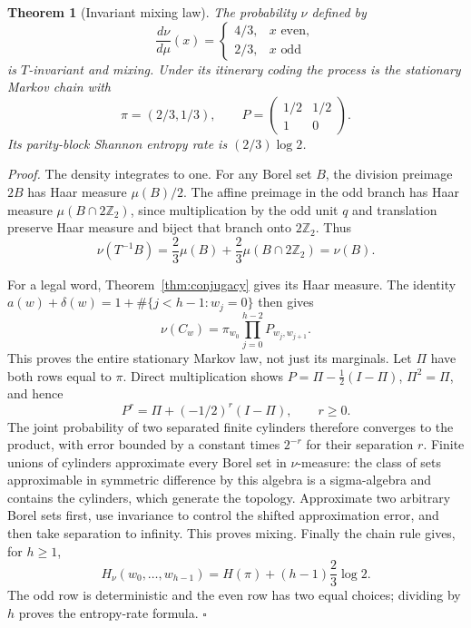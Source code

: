 \documentclass[11pt,letterpaper]{article}
\newcommand{\Z}{\mathbb{Z}}
\newtheorem{theorem}{Theorem}
\newenvironment{proof}{\noindent\textit{Proof.}}{\hfill\(\square\)}
\begin{document}
\begin{theorem}[Invariant mixing law]
\label{thm:measure}
The probability \(\nu\) defined by
\[
\frac{d\nu}{d\mu}(x)=
\begin{cases}4/3,&x\text{ even},\\2/3,&x\text{ odd}\end{cases}
\]
is \(T\)-invariant and mixing. Under its itinerary coding the process
is the stationary Markov chain with
\[
\pi=(2/3,1/3),\qquad
P=\begin{pmatrix}1/2&1/2\\1&0\end{pmatrix}.
\]
Its parity-block Shannon entropy rate is \((2/3)\log2\).
\end{theorem}

\begin{proof}
The density integrates to one. For any Borel set \(B\), the division
preimage \(2B\) has Haar measure \(\mu(B)/2\). The affine preimage
in the odd branch has Haar measure \(\mu(B\cap2\Z_2)\), since
multiplication by the odd unit \(q\) and translation preserve Haar
measure and biject that branch onto \(2\Z_2\). Thus
\[
\nu(T^{-1}B)=\frac23\mu(B)+\frac23\mu(B\cap2\Z_2)=\nu(B).
\]

For a legal word, Theorem~\ref{thm:conjugacy} gives its Haar measure.
The identity
\(a(w)+\delta(w)=1+\#\{j<h-1:w_j=0\}\) then gives
\[
\nu(C_w)=\pi_{w_0}\prod_{j=0}^{h-2}P_{w_j,w_{j+1}}.
\]
This proves the entire stationary Markov law, not just its marginals.
Let \(\Pi\) have both rows equal to \(\pi\). Direct multiplication
shows \(P=\Pi-\tfrac12(I-\Pi)\), \(\Pi^2=\Pi\), and hence
\[
P^r=\Pi+(-1/2)^r(I-\Pi),\qquad r\ge0.
\]
The joint probability of two separated finite cylinders therefore
converges to the product, with error bounded by a constant times
\(2^{-r}\) for their separation \(r\). Finite unions of cylinders
approximate every Borel set in \(\nu\)-measure: the class of sets
approximable in symmetric difference by this algebra is a sigma-algebra
and contains the cylinders, which generate the topology. Approximate
two arbitrary Borel sets first, use invariance to control the shifted
approximation error, and then take separation to infinity. This proves
mixing. Finally the chain rule gives, for \(h\ge1\),
\[
H_\nu(w_0,\ldots,w_{h-1})=H(\pi)+(h-1)\frac23\log2.
\]
The odd row is deterministic and the even row has two equal choices;
dividing by \(h\) proves the entropy-rate formula.
\end{proof}
\end{document}
